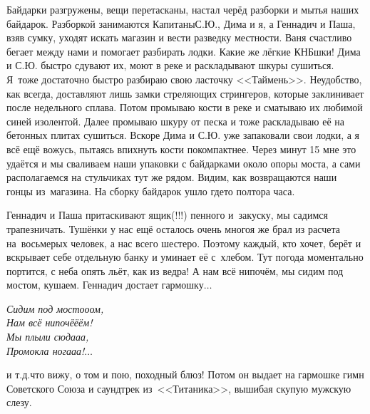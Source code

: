 \newpage
Байдарки разгружены, вещи перетасканы, настал черёд разборки и мытья наших байдарок. Разборкой занимаются Капитаны\mdash С.Ю., Дима и я, а Геннадич и Паша, взяв сумку, уходят искать магазин и вести разведку местности. Ваня счастливо бегает между нами и помогает разбирать лодки. Какие же лёгкие КНБ\sdash шки! Дима и С.Ю. быстро сдувают их, моют в реке и раскладывают шкуры сушиться. Я~тоже достаточно быстро разбираю свою ласточку <<Таймень>>. Неудобство, как всегда, доставляют лишь замки стреляющих стрингеров, которые заклинивает после недельного сплава. Потом промываю кости в реке и сматываю их любимой синей изолентой. Далее промываю шкуру от песка и тоже раскладываю её на бетонных плитах сушиться. Вскоре Дима и С.Ю. уже запаковали свои лодки, а я всё ещё вожусь, пытаясь впихнуть кости покомпактнее. Через минут 15 мне это удаётся и мы сваливаем наши упаковки с байдарками около опоры моста, а сами располагаемся на стульчиках тут же рядом. Видим, как возвращаются наши гонцы из~магазина. На сборку байдарок ушло где\sdash то полтора часа.

Геннадич и Паша притаскивают ящик(!!!) пенного и~закуску, мы садимся трапезничать. Тушёнки у нас ещё осталось очень много\mdash я же брал из расчета на~восьмерых человек, а нас всего шестеро. Поэтому каждый, кто хочет, берёт и вскрывает себе отдельную банку и уминает её с~хлебом. Тут погода моментально портится, с неба опять льёт, как из ведра! А нам всё нипочём, мы сидим под мостом, кушаем. Геннадич достает гармошку$\ldots$ %

\vspace{0.4cm}
\noindent\textit{%
\hspace*{3.5cm}Сидим под мосто\sdash о\sdash ом,\\
\hspace*{3.5cm}Нам всё нипочё\sdash ё\sdash ём!\\
\hspace*{3.5cm}Мы плыли сюда\sdash а\sdash а,\\ 
\hspace*{3.5cm}Промокла нога\sdash а\sdash а!$\ldots$ 
}

\newpage
\noindent и т.д.\mdash что вижу, о том и пою, походный блюз! Потом он выдает на гармошке гимн Советского Союза и саундтрек из~<<Титаника>>, вышибая скупую мужскую слезу. 

